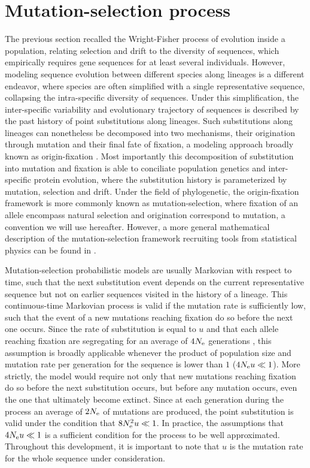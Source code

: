 \section{Mutation-selection process}
The previous section recalled the Wright-Fisher process of evolution inside a population, relating selection and drift to the diversity of sequences, which empirically requires gene sequences for at least several individuals.
However, modeling sequence evolution between different species along lineages is a different endeavor, where species are often simplified with a single representative sequence, collapsing the intra-specific diversity of sequences.
Under this simplification, the inter-specific variability and evolutionary trajectory of sequences is described by the past history of point substitutions along lineages.
Such substitutions along lineages can nonetheless be decomposed into two mechanisms, their origination through mutation and their final fate of fixation, a modeling approach broadly known as origin-fixation \citep{McCandlish2014}.
Most importantly this decomposition of \gls{substitution} into mutation and fixation is able to conciliate population genetics and inter-specific protein evolution, where the \gls{substitution} history is parameterized by mutation, selection and drift.
Under the field of phylogenetic, the origin-fixation framework is more commonly known as mutation-selection, where fixation of an \gls{allele} encompass natural selection and origination correspond to mutation, a convention we will use hereafter.
However, a more general mathematical description of the mutation-selection framework recruiting tools from statistical physics can be found in \citet{Sella2005, Mustonen2009}.

Mutation-selection probabilistic models are usually Markovian with respect to time, such that the next \gls{substitution} event depends on the current representative sequence but not on earlier sequences visited in the history of a lineage.
This continuous-time Markovian process is valid if the mutation rate is sufficiently low, such that the event of a new mutations reaching fixation do so before the next one occurs. 
Since the rate of \gls{substitution} is equal to $u$ and that each \gls{allele} reaching fixation are segregating for an average of $4 N_{\textrm{e}}$ generations \citep{Kimura1969}, this assumption is broadly applicable whenever the product of population size and mutation rate per generation for the sequence is lower than $1$ ($4 N_{\textrm{e}} u \ll 1$).
More strictly, the model would require not only that new mutations reaching fixation do so before the next \gls{substitution} occurs, but before any mutation occurs, even the one that ultimately become extinct.
Since at each generation during the process an average of $2N_{\textrm{e}}$ of mutations are produced, the point \gls{substitution} is valid under the condition that $8N_{\textrm{e}}^2 u \ll 1$.
In practice, the assumptions that $4 N_{\textrm{e}} u \ll 1$ is a sufficient condition for the process to be well approximated.
Throughout this development, it is important to note that $u$ is the mutation rate for the whole sequence under consideration.

